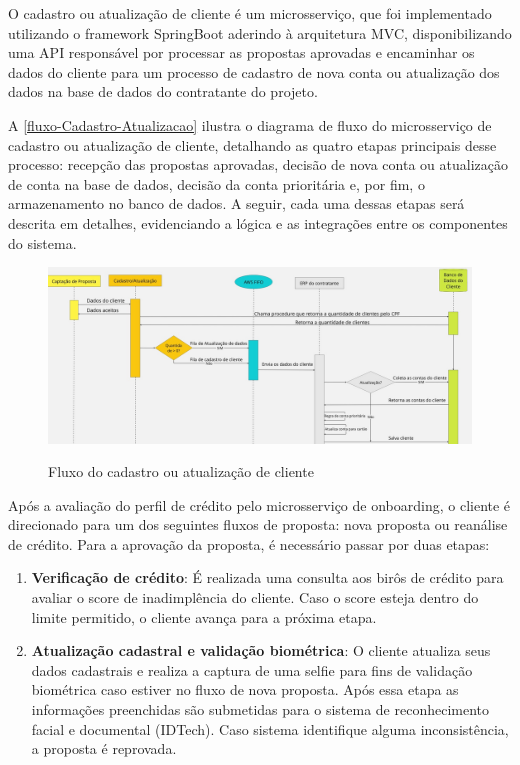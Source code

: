 O cadastro ou atualização de cliente é um microsserviço, que foi implementado utilizando o framework SpringBoot aderindo 
à arquitetura MVC, disponibilizando uma API responsável por processar as propostas aprovadas e encaminhar 
os dados do cliente para um processo de cadastro de nova conta ou atualização dos dados na base de dados do 
contratante  do projeto.

A \autoref{fluxo-Cadastro-Atualizacao} ilustra o diagrama de fluxo do microsserviço de cadastro ou atualização de cliente, 
detalhando as quatro etapas principais desse processo: recepção das propostas aprovadas, decisão de nova conta ou 
atualização de conta na base de dados, decisão da conta prioritária e, por fim, o armazenamento no banco de dados. 
A seguir, cada uma dessas etapas será descrita em detalhes, evidenciando a lógica e as integrações entre os componentes 
do sistema. 

\begin{figure} [!h]
    \centering
    \caption{Fluxo do cadastro ou atualização de cliente}
    \includegraphics[width=1\textwidth]{arquivos/imagens/Cadastro-Atualizacao-fluxo.jpg}
    \label{fluxo-Cadastro-Atualizacao}
\end{figure}

Após a avaliação do perfil de crédito pelo microsserviço de onboarding, 
o cliente é direcionado para um dos seguintes fluxos de proposta: 
nova proposta ou reanálise de crédito. 
Para a aprovação da proposta, é necessário passar por duas etapas:
\begin{enumerate}
    \item \textbf{Verificação de crédito}: É realizada uma consulta aos birôs de 
    crédito para avaliar o score de inadimplência do cliente. 
    Caso o score esteja dentro do limite permitido, o cliente avança 
    para a próxima etapa.
    \item \textbf{Atualização cadastral e validação biométrica}: O cliente 
    atualiza seus dados cadastrais e realiza a captura de uma selfie para fins 
    de validação biométrica caso estiver no fluxo de nova proposta.
    Após essa etapa as informações preenchidas são 
    submetidas para o sistema de reconhecimento facial e documental (IDTech). 
    Caso sistema identifique alguma inconsistência, a proposta é reprovada.
\end{enumerate}

